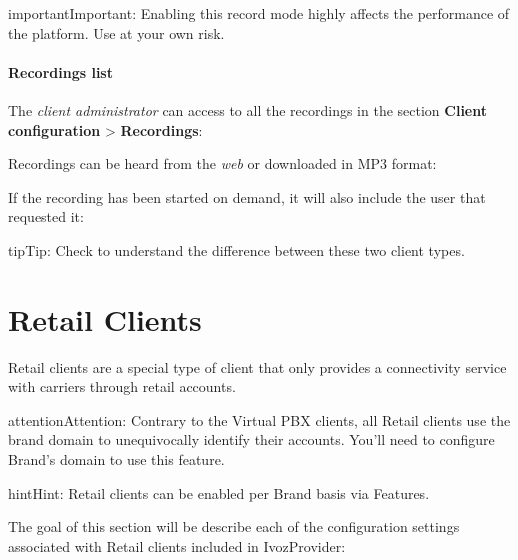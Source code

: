 \documentclass[letterpaper,10pt,english]{sphinxmanual}
\begin{document}
\begin{notice}{important}{Important:}
Enabling this record mode highly affects the performance of the
platform. Use at your own risk.
\end{notice}


\paragraph{Recordings list}
\label{administration_portal/client/residential/calls/call_recordings:recordings-list}
The \emph{client administrator} can access to all the recordings in the section
\textbf{Client configuration} \textgreater{} \textbf{Recordings}:

Recordings can be heard from the \emph{web} or downloaded in MP3 format:

If the recording has been started on demand, it will also include the user
that requested it:

\begin{notice}{tip}{Tip:}
Check {\hyperref[administration_portal/brand/clients/retail:differences\string-between\string-retail\string-and\string-residential\string-clients]{}} to understand the difference between these two
client types.
\end{notice}


\section{Retail Clients}
\label{administration_portal/client/retail/index:retail-clients}\label{administration_portal/client/retail/index::doc}
Retail clients are a special type of client that only provides a connectivity
service with carriers through retail accounts.

\begin{notice}{attention}{Attention:}
Contrary to the Virtual PBX clients, all Retail clients use the
brand domain to unequivocally identify their accounts. You'll need to configure
Brand's domain to use this feature.
\end{notice}

\begin{notice}{hint}{Hint:}
Retail clients can be enabled per Brand basis via Features.
\end{notice}

The goal of this section will be describe each of the configuration settings
associated with Retail clients included in IvozProvider:
\end{document}

